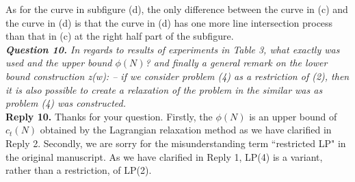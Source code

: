\documentclass[11pt]{article}
\begin{document}
As for the curve in subfigure (d), the only difference between the curve in (c) and the curve in (d) is that the curve in (d) has one more line intersection process than that in (c) at the right half part of the subfigure.
~\\[4mm]
\noindent \textit{\textbf{Question 10.}
In regards to results of experiments in Table 3, what exactly was used and the upper bound $\phi(N)$? and finally a general remark on the lower bound construction z(w):
-- if we consider problem (4) as a restriction of (2), then it is also possible to create a relaxation of the problem in the similar was as problem (4) was constructed.}
\\[2mm]
\noindent \textbf{Reply 10.}
Thanks for your question. Firstly, the $\phi(N)$ is an upper bound of $c_t(N)$ obtained by the Lagrangian relaxation method as we have clarified in Reply 2.
Secondly, we are sorry for the misunderstanding term ``restricted LP" in the original manuscript.
As we have clarified in Reply 1, LP(4) is a variant, rather than a restriction, of LP(2).
~\\[4mm]


%
%
%
%
%
%
%
%
\end{document}
